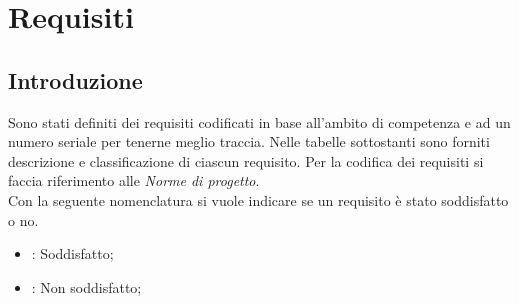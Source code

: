 


\newcommand{\RFM}{
    \stepcounter{M}
    \stepcounter{RF}
    \stepcounter{RF1}
    RF\arabic{RF}
}
\newcommand{\RFD}{
    \stepcounter{D}
    \stepcounter{RF}
    \stepcounter{RF2}
    RF\arabic{RF}
}
\newcommand{\RFO}{
    \stepcounter{O}
    \stepcounter{RF}
    \stepcounter{RF3}
    RF\arabic{RF}
}
\newcommand{\RVM}{
    \stepcounter{M}
    \stepcounter{RV}
    \stepcounter{RV1}
    RV\arabic{RV}
}
\newcommand{\RVD}{
    \stepcounter{D}
    \stepcounter{RV}
    \stepcounter{RV2}
    RV\arabic{RV}
}
\newcommand{\RVO}{
    \stepcounter{O}
    \stepcounter{RV}
    \stepcounter{RV3}
    RV\arabic{RV}
}
\newcommand{\RPM}{
    \stepcounter{M}
    \stepcounter{RP}
    \stepcounter{RP1}
    RP\arabic{RP}
}
\newcommand{\RPD}{
    \stepcounter{D}
    \stepcounter{RP}
    \stepcounter{RP2}
    RP\arabic{RP}
}
\newcommand{\RPO}{
    \stepcounter{O}
    \stepcounter{RP}
    \stepcounter{RP3}
    RP\arabic{RP}
}
\newcommand{\RQM}{
    \stepcounter{M}
    \stepcounter{RQ}
    \stepcounter{RQ1}
    RQ\arabic{RQ}
}
\newcommand{\RQD}{
    \stepcounter{D}
    \stepcounter{RQ}
    \stepcounter{RQ2}
    RQ\arabic{RQ}
}
\newcommand{\RQO}{
    \stepcounter{O}
    \stepcounter{RQ}
    \stepcounter{RQ3}
    RQ\arabic{RQ}
}



\section{Requisiti}
\subsection{Introduzione}
Sono stati definiti dei requisiti codificati in base all’ambito di competenza e ad un numero seriale per
tenerne meglio traccia. Nelle tabelle sottostanti sono forniti descrizione e classificazione di ciascun
requisito. 
Per la codifica dei requisiti si faccia riferimento alle \textit{Norme di progetto}.
\\
Con la seguente nomenclatura si vuole indicare se un requisito è stato soddisfatto o no.
\begin{itemize}
    \item {}: Soddisfatto; 
    \item {}: Non soddisfatto; 
\end{itemize}

